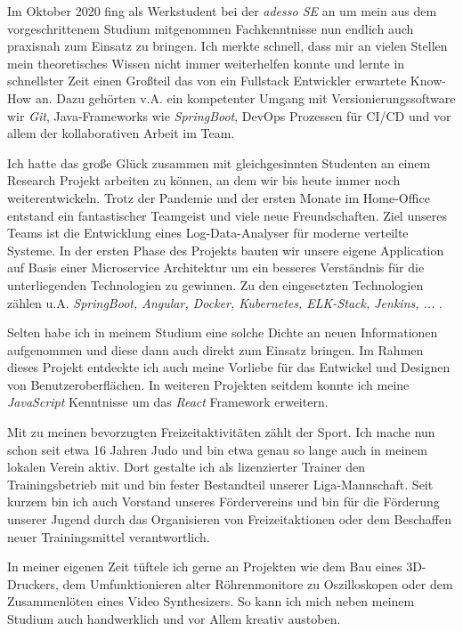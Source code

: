 \documentclass[11pt, a4paper]{awesome-cv}
\begin{document}
\begin{cvletter}
  Im Oktober 2020 fing als Werkstudent bei der \textit{adesso SE} an um mein aus dem vorgeschrittenem Studium mitgenommen Fachkenntnisse nun endlich auch praxisnah zum Einsatz zu bringen. Ich merkte schnell, dass mir an vielen Stellen mein theoretisches Wissen nicht immer weiterhelfen konnte und lernte in schnellster Zeit einen Großteil das von ein Fullstack Entwickler erwartete Know-How an. Dazu gehörten v.A. ein kompetenter Umgang mit Versionierungssoftware wir \textit{Git}, Java-Frameworks wie \textit{SpringBoot}, DevOps Prozessen für CI/CD und vor allem der kollaborativen Arbeit im Team.

  Ich hatte das große Glück zusammen mit gleichgesinnten Studenten an einem Research Projekt arbeiten zu können, an dem wir bis heute immer noch weiterentwickeln. Trotz der Pandemie und der ersten Monate im Home-Office entstand ein fantastischer Teamgeist und viele neue Freundschaften. Ziel unseres Teams ist die Entwicklung eines Log-Data-Analyser für moderne verteilte Systeme. In der ersten Phase des Projekts bauten wir unsere eigene Application auf Basis einer Microservice Architektur um ein besseres Verständnis für die unterliegenden Technologien zu gewinnen. Zu den eingesetzten Technologien zählen u.A. \textit{SpringBoot, Angular, Docker, Kubernetes, ELK-Stack, Jenkins, ...} .

  Selten habe ich in meinem Studium eine solche Dichte an neuen Informationen aufgenommen und diese dann auch direkt zum Einsatz bringen. Im Rahmen dieses Projekt entdeckte ich auch meine Vorliebe für das Entwickel und Designen von Benutzeroberflächen. In weiteren Projekten seitdem konnte ich meine \textit{JavaScript} Kenntnisse um das \textit{React} Framework erweitern.


  Mit zu meinen bevorzugten Freizeitaktivitäten zählt der Sport. Ich mache nun schon seit etwa 16 Jahren Judo und bin etwa genau so lange auch in meinem lokalen Verein aktiv. Dort gestalte ich als lizenzierter Trainer den Trainingsbetrieb mit und bin fester Bestandteil unserer Liga-Mannschaft. Seit kurzem bin ich auch Vorstand unseres Fördervereins und bin für die Förderung unserer Jugend durch das Organisieren von Freizeitaktionen oder dem Beschaffen neuer Trainingsmittel verantwortlich.

  In meiner eigenen Zeit tüftele ich gerne an Projekten wie dem Bau eines 3D-Druckers, dem Umfunktionieren alter Röhrenmonitore zu Oszilloskopen oder dem Zusammenlöten eines Video Synthesizers. So kann ich mich neben meinem Studium auch handwerklich und vor Allem kreativ austoben.


  \makeletterclosing

\end{cvletter}
\end{document}
